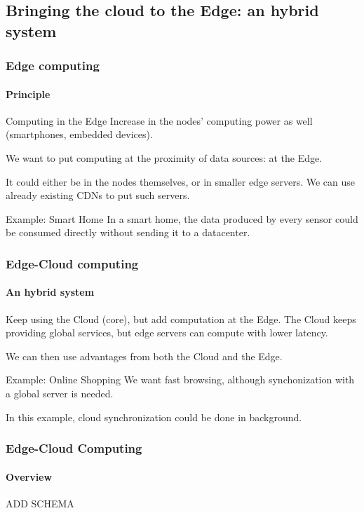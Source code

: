 \documentclass[utf8,xcolor=table, page number]{earlywinter}
\begin{document}
\subsection{Bringing the cloud to the Edge: an hybrid system} %
\begin{frame}
  \frametitle{Edge computing}
  \framesubtitle{Principle}

  \begin{block}{Computing in the Edge}
    Increase in the nodes' computing power as well (smartphones, embedded devices).
  \end{block}
   We want to put computing at the proximity of data sources: at the Edge.

   It could either be in the nodes themselves, or in smaller edge servers. We can use already existing CDNs to put such servers.
  
   \begin{exampleblock}{Example: Smart Home}
     In a smart home, the data produced by every sensor could be consumed directly without sending it to a datacenter.
   \end{exampleblock}

\end{frame}

\begin{frame}
  \frametitle{Edge-Cloud computing}
  \framesubtitle{An hybrid system}

%
  Keep using the Cloud (core), but add computation at the Edge.
  The Cloud keeps providing global services, but edge servers can compute with lower latency.

  We can then use advantages from both the Cloud and the Edge.
  
  \begin{exampleblock}{Example: Online Shopping}
    We want fast browsing, although synchonization with a global server is needed.
  \end{exampleblock}

  In this example, cloud synchronization could be done in background.
  
\end{frame}

\begin{frame}
\frametitle{Edge-Cloud Computing}
\framesubtitle{Overview}

ADD SCHEMA

\end{frame}
\end{document}
